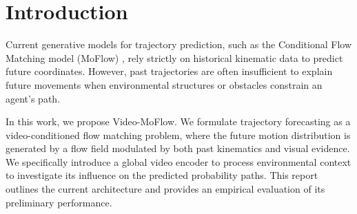 \section{Introduction}
Current generative models for trajectory prediction, such as the Conditional Flow Matching model (MoFlow) \cite{fu2025moflow}, rely strictly on historical kinematic data to predict future coordinates. However, past trajectories are often insufficient to explain future movements when environmental structures or obstacles constrain an agent's path.

In this work, we propose Video-MoFlow. We formulate trajectory forecasting as a video-conditioned flow matching problem, where the future motion distribution is generated by a flow field modulated by both past kinematics and visual evidence. We specifically introduce a global video encoder to process environmental context to investigate its influence on the predicted probability paths. This report outlines the current architecture and provides an empirical evaluation of its preliminary performance.

